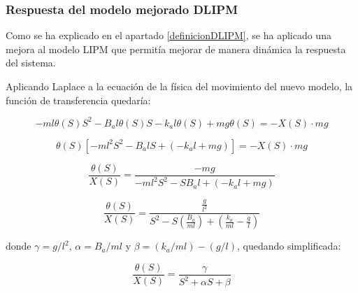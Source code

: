 \subsubsection{Respuesta del modelo mejorado DLIPM}

Como se ha explicado en el apartado \ref{definicionDLIPM}, se ha aplicado una mejora al modelo LIPM que permitía mejorar de manera dinámica la respuesta del sistema.

Aplicando Laplace a la ecuación de la física del movimiento del nuevo modelo, la función de transferencia quedaría:

\begin{equation*}
-ml{\theta}(S)S^{2} - B_a l{\theta}(S)S - k_a l\theta(S) + mg\theta(S)=- X(S) \cdot mg
\end{equation*}

\begin{equation*}
{\theta}(S)[-ml^{2}S^{2} - B_a lS + (-k_a l + mg)]=- X(S) \cdot mg
\end{equation*}

\begin{equation*}
\frac{{\theta}(S)}{X(S)}=\frac{-mg}{-ml^{2}S^{2} - S B_a l + (-k_a l + mg)}
\end{equation*}

\begin{equation}
\frac{{\theta}(S)}{X(S)}=\frac{\frac{g}{l^{2}}}{S^{2} - S (\frac{B_a}{ml}) + (\frac{k_a}{ml} - \frac{g}{l})}
\label{ec51}
\end{equation}

donde $\gamma=g/l^{2}$, $\alpha=B_{a}/ml$ y $\beta=(k_{a}/ml) - (g/l)$, quedando simplificada:

\begin{equation}
\frac{\theta(S)}{X(S)}=\frac{\gamma}{S^{2}+\alpha S+\beta }
\label{ec52}
\end{equation}

